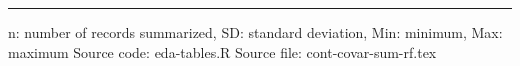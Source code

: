 \vskip 0.67cm
\begin{minipage}{1\linewidth}
\linespread{1.1}\selectfont
\rule{1\linewidth}{0.4pt}
\vskip 0.02cm
n: number of records summarized,
                 SD: standard deviation,
                 Min: minimum, Max: maximum \newline
Source code: eda-tables.R \newline
Source file: cont-covar-sum-rf.tex \newline
\end{minipage}
